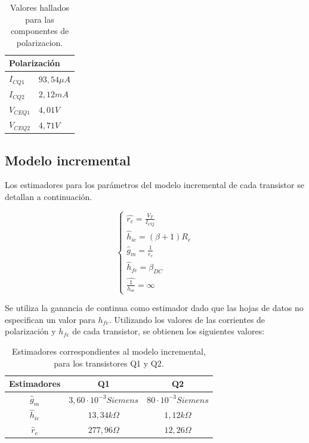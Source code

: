 \begin{table}[H]
	\centering
\begin{tabular}{ll}
\multicolumn{2}{l}{Polarización} \\ \hline
$I_{CQ1}$          & $93,54\mu A$       \\
$I_{CQ2}$        & $2,12mA$        \\
$V_{CEQ1}$         & $4,01V$       \\
$V_{CEQ2}$         & $4,71V$      
\end{tabular}
\caption{Valores hallados para las componentes de polarizacion.}
\label{tabla_valores_polarizacion}  
\end{table}


	\subsection{Modelo incremental}
	
	Los estimadores para los parámetros del modelo incremental de cada transistor se detallan a continuación.

		\begin{equation}
			\begin{cases}
			\widehat{r_{e}}=\frac{V_{T}}{I_{CQ}}\\
			{\widehat{h}_{ie}}=(\beta+1)R_{e}\\	
			{\widehat{g}_m}=\frac{1}{r_{e}}\\
			{\widehat{h}_{fe}}= \beta_{DC}\\
			\widehat{\frac{1}{h_{oe}}}= \infty
			\end{cases}
			\label{mod_inc_ecs}
		\end{equation}
		
	Se utiliza la ganancia de continua como estimador dado que las hojas de datos no especifican un valor para $h_{fe}$. Utilizando los valores de las corrientes de polarización y $h_{fe}$ de cada transistor, se obtienen los siguientes valores:
	

	\begin{table}[h!]
		\centering
		\begin{tabular}{c c c}%
			\bfseries Estimadores & Q1 & Q2 \\ \hline
			$\widehat{g}_m$ & $3,60\cdot 10^{-3}Siemens$  & $80\cdot 10^{-3}Siemens$ \\
			$\widehat{h}_{ie}$ & $13,34k\Omega$ &$1,12k\Omega$ \\
			$\widehat{r}_{e}$& $277,96\Omega$ &$12,26\Omega$ \\
			\hline
		\end{tabular}
		\caption{Estimadores correspondientes al modelo incremental, para los transistores Q1 y Q2.}
		\label{avolf}
	\end{table}
	
